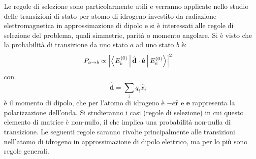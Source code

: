 \documentclass[11pt, a4paper]{scrartcl} %
\numberwithin{equation}{subsection}
\theoremstyle{style2}
\theoremstyle{style1}
\begin{document}
Le regole di selezione sono particolarmente utili e verranno applicate nello studio delle transizioni di stato per atomo di idrogeno investito da radiazione elettromagnetica in approssimazione di dipolo e si \`e interessati alle regole di selezione del problema, quali simmetrie, parit\`a o momento angolare.
Si \`e visto che la probabilit\`a di transizione da uno stato $a$ ad uno stato $b$ \`e:
\[
P_{a\to b} \propto \left\lvert \Braket{E_b^{(0)} |\hat{\mathbf{d} } \cdot \hat{\mathbf{e} }|E_a^{(0)} }  \right\rvert ^2
\] 
con 
\[
\hat{\mathbf{d} }= \sum_{i}^{} q_i \hat{x}_i 
\] 
\`e il momento di dipolo, che per l'atomo di idrogeno \`e $-e \hat{\mathbf{r} }$ e $\mathbf{e} $ rappresenta la polarizzazione dell'onda.
Si studieranno i casi (regole di selezione) in cui questo elemento di matrice \`e non-nullo, il che implica una probabilit\`a non-nulla di transizione.
Le seguenti regole saranno rivolte principalmente alle transizioni nell'atomo di idrogeno in approssimazione di dipolo elettrico, ma per lo pi\`u sono regole generali.
\end{document}
